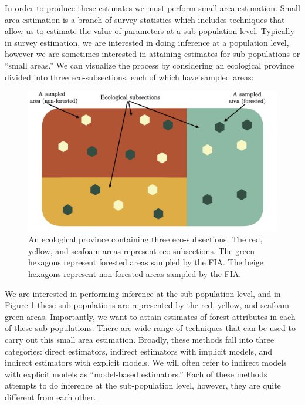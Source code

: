 \documentclass[12pt,twoside]{reedthesis}
\begin{document}
In order to produce these estimates we must perform small area estimation. Small area estimation is a branch of survey statistics which includes techniques that allow us to estimate the value of parameters at a sub-population level. Typically in survey estimation, we are interested in doing inference at a population level, however we are sometimes interested in attaining estimates for sub-populations or ``small areas.'' We can visualize the process by considering an ecological province divided into three eco-subsections, each of which have sampled areas:
\begin{figure}

{\centering \includegraphics[width=1\linewidth]{figure/ecoprov-diagram} 

}

\caption[An ecological province]{An ecological province containing three eco-subsections. The red, yellow, and seafoam areas represent eco-subsections. The green hexagons represent forested areas sampled by the FIA. The beige hexagons represent non-forested areas sampled by the FIA.}\label{fig:ecological-province-diagram}
\end{figure}
We are interested in performing inference at the sub-population level, and in Figure \ref{fig:ecological-province-diagram} these sub-populations are represented by the red, yellow, and seafoam green areas. Importantly, we want to attain estimates of forest attributes in each of these sub-populations. There are wide range of techniques that can be used to carry out this small area estimation. Broadly, these methods fall into three categories: direct estimators, indirect estimators with implicit models, and indirect estimators with explicit models. We will often refer to indirect models with explicit models as ``model-based estimators.'' Each of these methods attempts to do inference at the sub-population level, however, they are quite different from each other.
\end{document}
